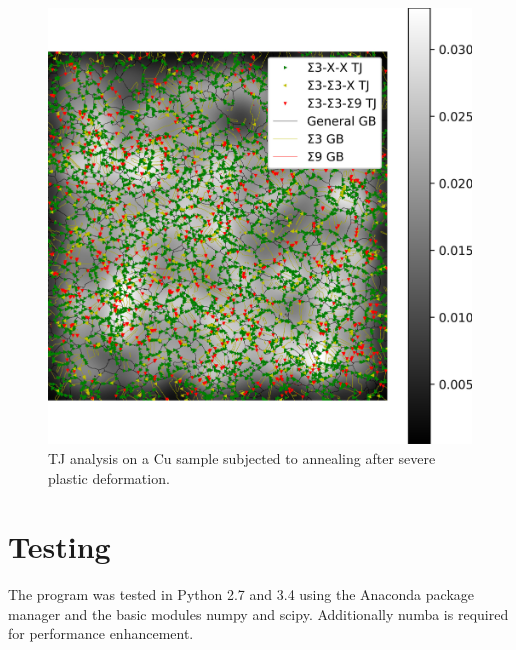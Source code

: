 \documentclass{article}
\begin{document}
\begin{figure}[ht]
\centering
\includegraphics[width=\linewidth]{figs/Cu_TJ_analysis}
\caption{TJ analysis on a Cu sample subjected to annealing after severe plastic deformation.}
\label{fig:Cu_SPD}
\end{figure}
\section{Testing}
The program was tested in Python 2.7 and 3.4 using the Anaconda package manager and the basic modules numpy and scipy. Additionally numba is required for performance enhancement.
\end{document}
